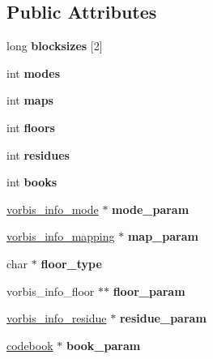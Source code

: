 \subsection*{Public Attributes}
\begin{DoxyCompactItemize}
\item 
\mbox{\label{structcodec__setup__info_a8b08129139f671b7bbd9573aa2576fe9}} 
long {\bfseries blocksizes} \mbox{[}2\mbox{]}
\item 
\mbox{\label{structcodec__setup__info_a922009abe4668e454cc238a6c27b337d}} 
int {\bfseries modes}
\item 
\mbox{\label{structcodec__setup__info_a0631814413bb5e4cad9d6c34abea2d25}} 
int {\bfseries maps}
\item 
\mbox{\label{structcodec__setup__info_a07326866bbd3e16ba395995c47f1afe5}} 
int {\bfseries floors}
\item 
\mbox{\label{structcodec__setup__info_af730d6d8181fb830badaf26b6b688afb}} 
int {\bfseries residues}
\item 
\mbox{\label{structcodec__setup__info_a2a1ae7d41f735899ade353d16b5163d1}} 
int {\bfseries books}
\item 
\mbox{\label{structcodec__setup__info_a6f427f14f1b8baa26e62bdfdc8c26f86}} 
\hyperlink{structvorbis__info__mode}{vorbis\+\_\+info\+\_\+mode} $\ast$ {\bfseries mode\+\_\+param}
\item 
\mbox{\label{structcodec__setup__info_abe9ddff9412798e047a8dc025ca90b1b}} 
\hyperlink{structvorbis__info__mapping}{vorbis\+\_\+info\+\_\+mapping} $\ast$ {\bfseries map\+\_\+param}
\item 
\mbox{\label{structcodec__setup__info_ab0297541aacea930cfeb2677ab2f3ea6}} 
char $\ast$ {\bfseries floor\+\_\+type}
\item 
\mbox{\label{structcodec__setup__info_a986f82c1e720288549e0ddad1f37ed19}} 
vorbis\+\_\+info\+\_\+floor $\ast$$\ast$ {\bfseries floor\+\_\+param}
\item 
\mbox{\label{structcodec__setup__info_a07c797a7482fda72c78bac5736e066a0}} 
\hyperlink{structvorbis__info__residue}{vorbis\+\_\+info\+\_\+residue} $\ast$ {\bfseries residue\+\_\+param}
\item 
\mbox{\label{structcodec__setup__info_a21003cc293d7a42a22bb3093a6043f80}} 
\hyperlink{structcodebook}{codebook} $\ast$ {\bfseries book\+\_\+param}
\end{DoxyCompactItemize}


